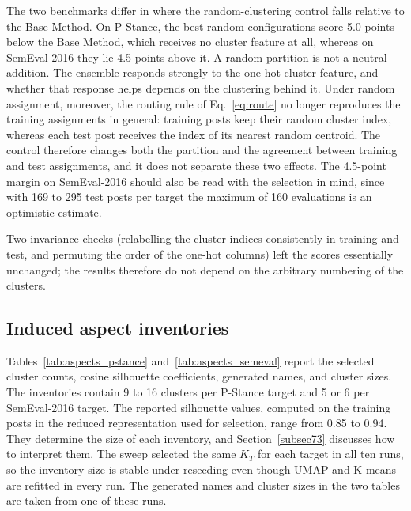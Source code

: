 \documentclass[pdflatex,sn-mathphys-num,iicol]{sn-jnl}%
\begin{document}
The two benchmarks differ in where the random-clustering control falls relative to the Base Method. On P-Stance, the best random configurations score 5.0 points below the Base Method, which receives no cluster feature at all, whereas on SemEval-2016 they lie 4.5 points above it. A random partition is not a neutral addition. The ensemble responds strongly to the one-hot cluster feature, and whether that response helps depends on the clustering behind it. Under random assignment, moreover, the routing rule of Eq.~\eqref{eq:route} no longer reproduces the training assignments in general: training posts keep their random cluster index, whereas each test post receives the index of its nearest random centroid. The control therefore changes both the partition and the agreement between training and test assignments, and it does not separate these two effects. The 4.5-point margin on SemEval-2016 should also be read with the selection in mind, since with 169 to 295 test posts per target the maximum of 160 evaluations is an optimistic estimate.

Two invariance checks (relabelling the cluster indices consistently in training and test, and permuting the order of the one-hot columns) left the scores essentially unchanged; the results therefore do not depend on the arbitrary numbering of the clusters.

\subsection{Induced aspect inventories}\label{sec:inventories}

Tables~\ref{tab:aspects_pstance} and~\ref{tab:aspects_semeval} report the selected cluster counts, cosine silhouette coefficients, generated names, and cluster sizes. The inventories contain 9 to 16 clusters per P-Stance target and 5 or 6 per SemEval-2016 target. The reported silhouette values, computed on the training posts in the reduced representation used for selection, range from 0.85 to 0.94. They determine the size of each inventory, and Section~\ref{subsec73} discusses how to interpret them. The sweep selected the same \(K_T\) for each target in all ten runs, so the inventory size is stable under reseeding even though UMAP and K-means are refitted in every run.
The generated names and cluster sizes in the two tables are taken from one of these runs.
\end{document}
